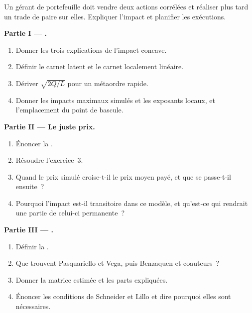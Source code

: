 \begin{problem}\label{pb:mx:metaorders-latent-liquidity-and-cross-impact:1}
Un gérant de portefeuille doit vendre deux actions corrélées et réaliser plus tard un trade de paire sur elles. Expliquer l'impact et planifier les exécutions.

\medskip\noindent\textbf{Partie I --- .}
\begin{enumerate}
\item Donner les trois explications de l'impact concave.
\item Définir le carnet latent et le carnet localement linéaire.
\item Dériver $\sqrt{2Q/L}$ pour un métaordre rapide.
\item Donner les impacts maximaux simulés et les exposants locaux, et l'emplacement du point de bascule.
\end{enumerate}

\medskip\noindent\textbf{Partie II --- Le juste prix.}
\begin{enumerate}[resume]
\item Énoncer la .
\item Résoudre l'exercice~3.
\item Quand le prix simulé croise-t-il le prix moyen payé, et que se passe-t-il ensuite~?
\item Pourquoi l'impact est-il transitoire dans ce modèle, et qu'est-ce qui rendrait une partie de celui-ci permanente~?
\end{enumerate}

\medskip\noindent\textbf{Partie III --- .}
\begin{enumerate}[resume]
\item Définir la .
\item Que trouvent Pasquariello et Vega, puis Benzaquen et coauteurs~?
\item Donner la matrice estimée et les parts expliquées.
\item Énoncer les conditions de Schneider et Lillo et dire pourquoi elles sont nécessaires.
\end{enumerate}


\end{problem}
